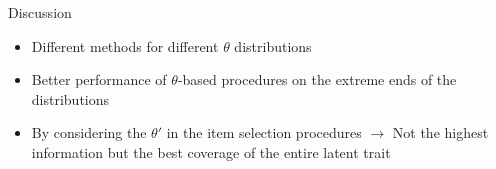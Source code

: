 \documentclass[final,t]{beamer}
\begin{document}
\begin{frame}
\begin{columns}[t]
\begin{column}{.45\linewidth}
				\begin{block}{Discussion}
					\begin{itemize}
						\item Different methods for different $\theta$ distributions
						
						\item  Better performance of $\theta$-based procedures on the extreme ends of the distributions
						
						\item By considering the $\theta'$ in the item selection procedures $\rightarrow$ Not the highest information but the best coverage of the entire latent trait
					\end{itemize}

				\end{block}
			
	
				
			\end{column}
		\end{columns}
		
		
	\end{frame}
	
\end{document}
